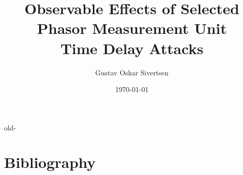 \documentclass[british,titlepage,twoside]{ntnuthesis}
\title{Observable Effects of Selected\\ Phasor Measurement Unit\\ Time Delay Attacks}
\author{Gustav Oskar Sivertsen}
\date{\today}
\let\includegraphicsold\includegraphics
\renewcommand{\includegraphics}[2][ ]{\tcbox[size=small, standard jigsaw, opacityback=0]{\includegraphicsold[#1]{#2}}}
\begin{document}





\listoffigures
\listoftables

 
 \tableofcontents









\let\includegraphics-old\includegraphics

\let\includegraphics\includegraphicsold







%
%
%
%

\chapter*{Bibliography}
\printbibliography[heading=none]

%

%



%
%
%
\end{document}
